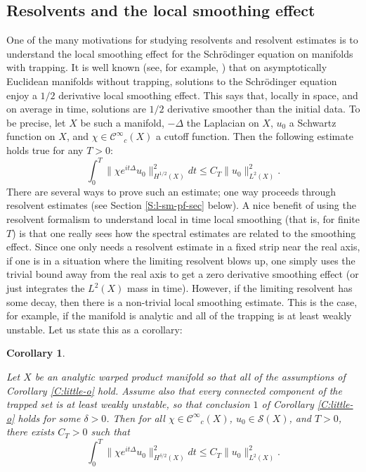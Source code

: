 \documentclass[twoside, final]{amsart}
\newtheorem{corollary}[proposition]{Corollary}
\theoremstyle{definition}
\numberwithin{equation}{section}
\begin{document}
\subsection{Resolvents and the local smoothing effect}
One of the many motivations for studying resolvents and resolvent
estimates is to understand the local smoothing effect for the
Schr\"odinger equation on manifolds with trapping.  It is well known
(see, for example, \cite{Tao-book,Doi}) that on asymptotically
Euclidean manifolds without trapping, solutions to the Schr\"odinger
equation enjoy a $1/2$ derivative local smoothing effect.  This says
that, locally in space, and on average in time, solutions are $1/2$
derivative smoother than the initial data.  To be precise, let $X$ be
such a manifold, $-\Delta$ the Laplacian on $X$, $u_0$ a Schwartz
function on $X$, and $\chi \in {{\mathcal C}^\infty}_c(X)$ a cutoff function.  Then the following estimate holds true for any $T>0$:
\[
\int_0^T \| \chi e^{i t \Delta} u_0 \|_{H^{1/2}(X)}^2 dt {\leqslant} C_T \|
u_0 \|_{L^2(X)}^2.
\]
There are several ways to prove such an estimate; one way proceeds
through resolvent estimates (see Section \ref{S:l-sm-pf-sec} below).
A nice benefit of using the resolvent formalism to understand local in
time local smoothing (that is, for finite $T$) is that one really sees
how the spectral estimates are related to the smoothing effect.  Since
one only needs a resolvent estimate in a fixed strip near the real
axis, if one is in a situation where the limiting resolvent blows up,
one simply uses the trivial bound away from the real axis to get a
zero derivative smoothing effect (or just integrates the $L^2(X)$ mass
in time).  However, if the limiting resolvent has some decay, then
there is a non-trivial local smoothing estimate.  This is the case,
for example, if the manifold is analytic and all of the trapping is
at least weakly unstable.  Let us state this as a corollary:

\begin{corollary}
\label{C:l-sm-cor}

Let $X$ be an analytic warped product manifold so that all of the assumptions of Corollary
\ref{C:little-o} hold.  Assume also that every connected component of
the trapped set is at least weakly unstable, so that conclusion $1$ of
Corollary \ref{C:little-o} holds for some $\delta>0$.  Then for all
$\chi \in {{\mathcal C}^\infty}_c(X)$, $u_0 \in {{\mathcal S}} (X)$, and $T>0$, there exists $C_T>0$
such that
\[
\int_0^T \| \chi e^{it \Delta} u_0 \|_{H^{\delta/2}(X)}^2 dt {\leqslant} C_T
\| u_0 \|_{L^2(X)}^2.
\]

\end{corollary}
\end{document}

